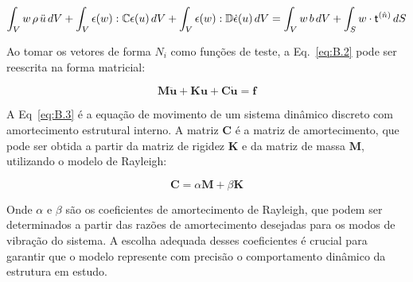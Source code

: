 \begin{equation}
    \int_{V} w \hspace{1.5pt} \rho \hspace{1.5pt} \ddot{u} \hspace{1.5pt} dV + \int_{V}  \epsilon(w) : \mathbb{C} \epsilon(u) \hspace{1.5pt} dV + \int_{V}  \epsilon(w) : \mathbb{D} \dot{\epsilon}(u) \hspace{1.5pt} dV  = \int_{V} w \hspace{1.5pt} b \hspace{1.5pt} dV + \int_{S} w \cdot \mathsf{t}^{(\hat{n})} \hspace{1.5pt} dS
    \label{eq:B.2}
\end{equation}

\indent Ao tomar os vetores de forma $N_i$ como funções de teste, a Eq.~\ref{eq:B.2} pode ser reescrita na forma matricial:

\begin{equation}
    \mathbf{M} \ddot{\mathbf{u}} + \mathbf{K} \mathbf{u} + \mathbf{C} \dot{\mathbf{u}} = \mathbf{f}
    \label{eq:B.3}
\end{equation}

\indent A Eq~\ref{eq:B.3} é a equação de movimento de um sistema dinâmico discreto com amortecimento estrutural interno. A matriz $\mathbf{C}$ é a matriz de amortecimento, que pode ser obtida a partir da matriz de rigidez $\mathbf{K}$ e da matriz de massa $\mathbf{M}$, utilizando o modelo de Rayleigh:

\begin{equation}
    \mathbf{C} = \alpha \mathbf{M} + \beta \mathbf{K}
    \label{eq:B.4}
\end{equation}

\indent Onde $\alpha$ e $\beta$ são os coeficientes de amortecimento de Rayleigh, que podem ser determinados a partir das razões de amortecimento desejadas para os modos de vibração do sistema. A escolha adequada desses coeficientes é crucial para garantir que o modelo represente com precisão o comportamento dinâmico da estrutura em estudo.\\

